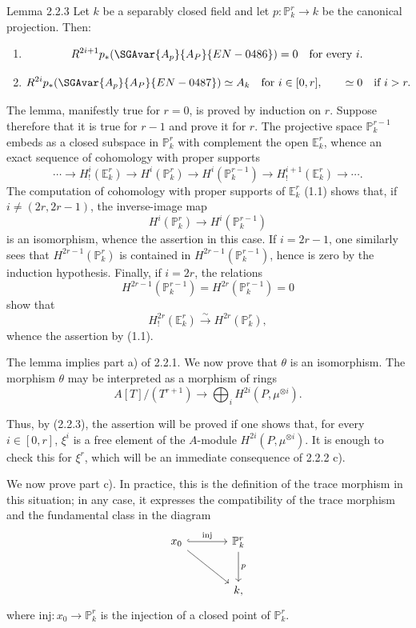 \begin{statement}{Lemma 2.2.3}
Let $k$ be a separably closed field and let $p:\mathbb P_k^r\to k$ be the canonical projection. Then:
\begin{enumerate}[label=\alph*)]
\item
\[
R^{2i+1}p_*(\SGAvar{A_p}{A_P}{EN-0486})=0\quad\text{for every }i.
\]
\item
\[
R^{2i}p_*(\SGAvar{A_p}{A_P}{EN-0487})\simeq A_k\quad\text{for }i\in[0,r],
\qquad
\simeq 0\quad\text{if }i>r.
\]
\end{enumerate}
\end{statement}

The lemma, manifestly true for $r=0$, is proved by induction on $r$. Suppose therefore that it is true for $r-1$ and prove it for $r$. The projective space $\mathbb P_k^{r-1}$ embeds as a closed subspace in $\mathbb P_k^r$ with complement the open $\mathbb E_k^r$, whence an exact sequence of cohomology with proper supports
\[
\cdots\longrightarrow H_!^i(\mathbb E_k^r)\longrightarrow H^i(\mathbb P_k^r)
\longrightarrow H^i(\mathbb P_k^{r-1})\longrightarrow H_!^{i+1}(\mathbb E_k^r)\longrightarrow\cdots.
\]
The computation of cohomology with proper supports of $\mathbb E_k^r$ (1.1) shows that, if $i\ne(2r,2r-1)$, the inverse-image map
\[
H^i(\mathbb P_k^r)\longrightarrow H^i(\mathbb P_k^{r-1})
\]
is an isomorphism, whence the assertion in this case. If $i=2r-1$, one similarly sees that $H^{2r-1}(\mathbb P_k^r)$ is contained in $H^{2r-1}(\mathbb P_k^{r-1})$, hence is zero by the induction hypothesis. Finally, if $i=2r$, the relations
\[
H^{2r-1}(\mathbb P_k^{r-1})=H^{2r}(\mathbb P_k^{r-1})=0
\]
show that
\[
H_!^{2r}(\mathbb E_k^r)\xrightarrow{\sim}H^{2r}(\mathbb P_k^r),
\]
whence the assertion by (1.1).

The lemma implies part a) of 2.2.1. We now prove that $\theta$ is an isomorphism. The morphism $\theta$ may be interpreted as a morphism of rings
\[
A[T]/(T^{r+1})\longrightarrow\bigoplus_i H^{2i}(P,\mu^{\otimes i}).
\]


Thus, by (2.2.3), the assertion will be proved if one shows that, for every $i\in[0,r]$, $\xi^i$ is a free element of the $A$-module $H^{2i}(P,\mu^{\otimes i})$. It is enough to check this for $\xi^r$, which will be an immediate consequence of 2.2.2 c).

We now prove part c). In practice, this is the definition of the trace morphism in this situation; in any case, it expresses the compatibility of the trace morphism and the fundamental class in the diagram
\[
\begin{tikzcd}[column sep=large,row sep=large]
x_0 \arrow[r,hook,"\mathrm{inj}"] \arrow[dr] & \mathbb P^r_k \arrow[d,"p"]\\
& k ,
\end{tikzcd}
\]
where $\mathrm{inj}:x_0\to \mathbb P^r_k$ is the injection of a closed point of $\mathbb P^r_k$.

